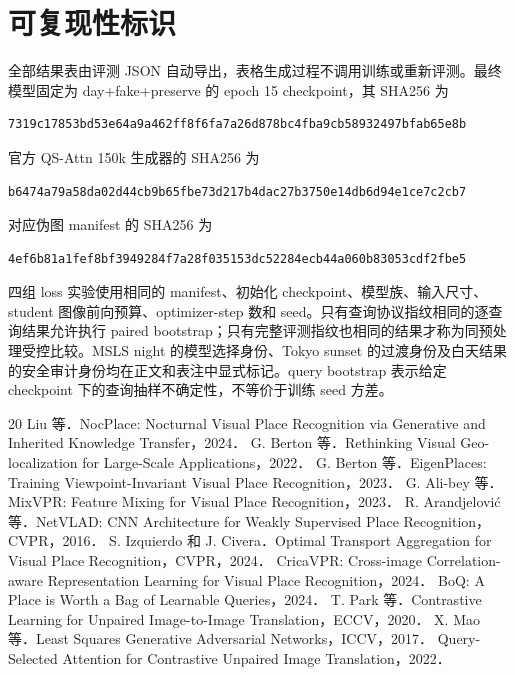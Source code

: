 \documentclass[UTF8,a4paper,11pt]{ctexart}
\begin{document}
\section{可复现性标识}
全部结果表由评测 JSON 自动导出，表格生成过程不调用训练或重新评测。最终模型固定为 day+fake+preserve 的 epoch 15 checkpoint，其 SHA256 为
\begin{verbatim}
7319c17853bd53e64a9a462ff8f6fa7a26d878bc4fba9cb58932497bfab65e8b
\end{verbatim}
官方 QS-Attn 150k 生成器的 SHA256 为
\begin{verbatim}
b6474a79a58da02d44cb9b65fbe73d217b4dac27b3750e14db6d94e1ce7c2cb7
\end{verbatim}
对应伪图 manifest 的 SHA256 为
\begin{verbatim}
4ef6b81a1fef8bf3949284f7a28f035153dc52284ecb44a060b83053cdf2fbe5
\end{verbatim}
四组 loss 实验使用相同的 manifest、初始化 checkpoint、模型族、输入尺寸、student 图像前向预算、optimizer-step 数和 seed。只有查询协议指纹相同的逐查询结果允许执行 paired bootstrap；只有完整评测指纹也相同的结果才称为同预处理受控比较。MSLS night 的模型选择身份、Tokyo sunset 的过渡身份及白天结果的安全审计身份均在正文和表注中显式标记。query bootstrap 表示给定 checkpoint 下的查询抽样不确定性，不等价于训练 seed 方差。

\begin{thebibliography}{20}
 Liu 等．NocPlace: Nocturnal Visual Place Recognition via Generative and Inherited Knowledge Transfer，2024．
 G. Berton 等．Rethinking Visual Geo-localization for Large-Scale Applications，2022．
 G. Berton 等．EigenPlaces: Training Viewpoint-Invariant Visual Place Recognition，2023．
 G. Ali-bey 等．MixVPR: Feature Mixing for Visual Place Recognition，2023．
 R. Arandjelovi\'{c} 等．NetVLAD: CNN Architecture for Weakly Supervised Place Recognition，CVPR，2016．
 S. Izquierdo 和 J. Civera．Optimal Transport Aggregation for Visual Place Recognition，CVPR，2024．
 CricaVPR: Cross-image Correlation-aware Representation Learning for Visual Place Recognition，2024．
 BoQ: A Place is Worth a Bag of Learnable Queries，2024．
 T. Park 等．Contrastive Learning for Unpaired Image-to-Image Translation，ECCV，2020．
 X. Mao 等．Least Squares Generative Adversarial Networks，ICCV，2017．
 Query-Selected Attention for Contrastive Unpaired Image Translation，2022．
\end{thebibliography}
\end{document}
